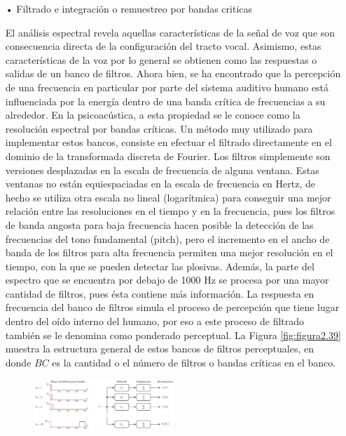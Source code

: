 \begin{enumerate}
\begin{enumerate}
\item[•]Filtrado e integración o remuestreo por bandas criticas
\par
El análisis espectral revela aquellas características de la señal de voz que son consecuencia directa de la configuración del tracto vocal. Asimismo, estas características de la voz por lo general se obtienen como las respuestas o salidas de un banco de filtros.
\vskip 0.5cm
Ahora bien, se ha encontrado que la percepción de una frecuencia en particular por parte del sistema auditivo humano está influenciada por la energía dentro de una banda crítica de frecuencias a su alrededor. En la psicoacústica, a esta propiedad se le conoce como la resolución espectral por bandas críticas.
\vskip 0.5cm
Un método muy utilizado para implementar estos bancos, consiste en efectuar el filtrado directamente en el dominio de la transformada discreta de Fourier. Los filtros simplemente son versiones desplazadas en la escala de frecuencia de alguna ventana. 
\vskip 0.5cm
Estas ventanas no están equiespaciadas en la escala de frecuencia en Hertz, de hecho se utiliza otra escala no lineal (logarítmica) para conseguir una mejor relación entre las resoluciones en el tiempo y en la frecuencia, pues los filtros de banda angosta para baja frecuencia hacen posible la detección de las frecuencias del tono fundamental (pitch), pero el incremento en el ancho de banda de los filtros para alta frecuencia permiten una mejor resolución en el tiempo, con la que se pueden detectar las plosivas. Además, la parte del espectro que se encuentra por debajo de 1000 Hz se procesa por una mayor cantidad de filtros, pues ésta contiene más información.
\vskip 0.5cm
La respuesta en frecuencia del banco de filtros simula el proceso de percepción que tiene lugar dentro del oído interno del humano, por eso a este proceso de filtrado también se le denomina como ponderado perceptual. La Figura \ref{fig:figura2.39} muestra la estructura general de estos bancos de filtros perceptuales, en donde $BC$ es la cantidad o el número de filtros o bandas críticas en el banco. 
\begin{figure}[H]
\begin{center}
\includegraphics[width=0.5\textwidth]{Imagenes/Cap2/image040}
\end{center}

\end{figure}
\end{enumerate}
\end{enumerate}
